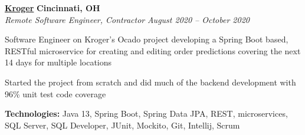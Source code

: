 %
    \headerrow
        {\textbf{\href{https://www.kroger.com/}{Kroger}}}
        {\textbf{Cincinnati, OH}}
    \\
    \headerrow
        {\emph{Remote Software Engineer, Contractor}}
        {\emph{August 2020 -- October 2020}}
    \begin{itemize*}
        \item Software Engineer on Kroger's Ocado project developing a Spring Boot based, RESTful microservice for creating and editing
            order predictions covering the next 14 days for multiple locations
        \item Started the project from scratch and did much of the backend development with 96\% unit test code coverage
    \end{itemize*}

    \hspace{1.0em}
        {\textbf{Technologies:} Java 13, Spring Boot, Spring Data JPA, REST, microservices, SQL Server, SQL Developer, JUnit, Mockito,
            Git, Intellij, Scrum}

